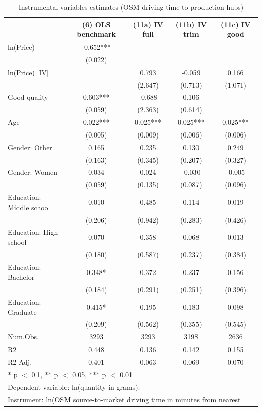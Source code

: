 \begin{table}[H]
\centering
\caption{Instrumental-variables estimates (OSM driving time to production hubs)}
\label{tab:iv-distance}
\centering
\begin{tabular}[t]{lcccc}
\toprule
  & (6) OLS benchmark & (11a) IV full & (11b) IV trim & (11c) IV good\\
\midrule
ln(Price) & -0.652*** &  &  & \\
 & (0.022) &  &  & \\
ln(Price) [IV] &  & 0.793 & -0.059 & 0.166\\
 &  & (2.647) & (0.713) & (1.071)\\
Good quality & 0.603*** & -0.688 & 0.106 & \\
 & (0.059) & (2.363) & (0.614) & \\
Age & 0.022*** & 0.025*** & 0.025*** & 0.025***\\
 & (0.005) & (0.009) & (0.006) & (0.006)\\
Gender: Other & 0.165 & 0.235 & 0.130 & 0.249\\
 & (0.163) & (0.345) & (0.207) & (0.327)\\
Gender: Women & 0.034 & 0.024 & -0.030 & -0.005\\
 & (0.059) & (0.135) & (0.087) & (0.096)\\
Education: Middle school & 0.010 & 0.485 & 0.114 & 0.019\\
 & (0.206) & (0.942) & (0.283) & (0.426)\\
Education: High school & 0.070 & 0.358 & 0.068 & 0.013\\
 & (0.180) & (0.587) & (0.237) & (0.384)\\
Education: Bachelor & 0.348* & 0.372 & 0.237 & 0.156\\
 & (0.184) & (0.291) & (0.251) & (0.396)\\
Education: Graduate & 0.415* & 0.195 & 0.183 & 0.098\\
 & (0.209) & (0.562) & (0.355) & (0.545)\\
\midrule
Num.Obs. & 3293 & 3293 & 3198 & 2636\\
R2 & 0.448 & 0.136 & 0.142 & 0.155\\
R2 Adj. & 0.401 & 0.063 & 0.069 & 0.070\\
\bottomrule
\multicolumn{5}{l}{\rule{0pt}{1em}* p $<$ 0.1, ** p $<$ 0.05, *** p $<$ 0.01}\\
\multicolumn{5}{l}{\rule{0pt}{1em}Dependent variable: ln(quantity in grams).}\\
\multicolumn{5}{l}{\rule{0pt}{1em}Instrument: ln(OSM source-to-market driving time in minutes from nearest}\\

\end{tabular}
\end{table}
